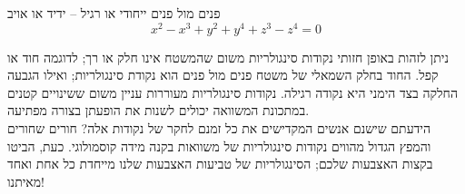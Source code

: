 \begin{surferPage}{%
 פנים מול פנים
}
ייחודי או רגיל – ידיד או אויב
\smallskip
\[x^2	- x^3+ y^2+ y^4+ z^3- z^4	=  0\]

\vspace{0,3cm}
ניתן לזהות באופן חזותי נקודות סינגולריות משום שהמשטח אינו חלק או רך; לדוגמה חוד או קפל.
\vspace{0,3cm}
החוד בחלק השמאלי של משטח פנים מול פנים הוא נקודת סינגולריות; ואילו הגבעה החלקה בצד הימני היא נקודה רגילה. נקודות סינגולריות מעוררות עניין משום ששינויים קטנים במתכונת המשוואה יכולים לשנות את הופעתן בצורה מפתיעה. \\

\vspace{0,3cm}
הידעתם שישנם אנשים המקדישים את כל זמנם לחקר של נקודות אלה? חורים שחורים והמפץ הגדול מהווים נקודות סינגולריות של משוואות בקנה מידה קוסמולוגי. כעת, הביטו בקצות האצבעות שלכם; הסינגולריות של טביעות האצבעות שלנו מייחדת כל אחת ואחד מאיתנו!
\end{surferPage}
